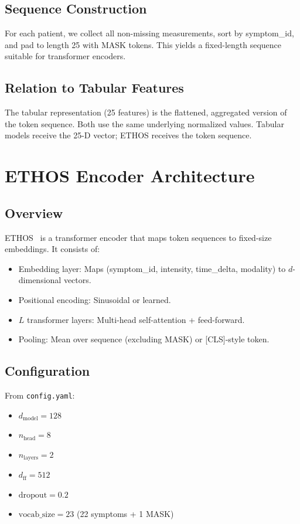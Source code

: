 \subsection{Sequence Construction}

For each patient, we collect all non-missing measurements, sort by symptom\_id, and pad to length 25 with MASK tokens. This yields a fixed-length sequence suitable for transformer encoders.

\subsection{Relation to Tabular Features}

The tabular representation (25 features) is the flattened, aggregated version of the token sequence. Both use the same underlying normalized values. Tabular models receive the 25-D vector; ETHOS receives the token sequence.

\section{ETHOS Encoder Architecture}

\subsection{Overview}

ETHOS~\cite{sharafi2023ethos} is a transformer encoder that maps token sequences to fixed-size embeddings. It consists of:
\begin{itemize}
\item Embedding layer: Maps (symptom\_id, intensity, time\_delta, modality) to $d$-dimensional vectors.
\item Positional encoding: Sinusoidal or learned.
\item $L$ transformer layers: Multi-head self-attention + feed-forward.
\item Pooling: Mean over sequence (excluding MASK) or [CLS]-style token.
\end{itemize}

\subsection{Configuration}

From \texttt{config.yaml}:
\begin{itemize}
\item $d_{\text{model}} = 128$
\item $n_{\text{head}} = 8$
\item $n_{\text{layers}} = 2$
\item $d_{\text{ff}} = 512$
\item $\text{dropout} = 0.2$
\item $\text{vocab\_size} = 23$ (22 symptoms + 1 MASK)
\end{itemize}


